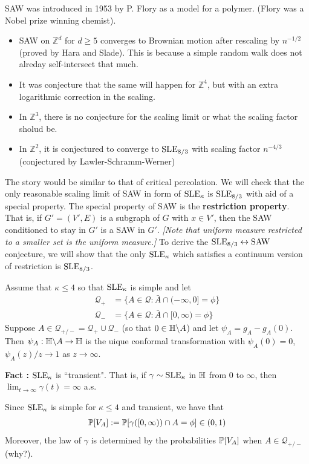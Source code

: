 \documentclass[12pt,a4paper]{article}
\renewenvironment{i}
{\begin{itemize} 
	}%
	{\end{itemize}
}
\begin{document}
\quad SAW was introduced in 1953 by P. Flory as a model for a polymer. (Flory was a Nobel prize winning chemist). 
\begin{i}
\item SAW on $\mathbb{Z}^d$ for $d\geq 5$ converges to Brownian motion after rescaling  by $n^{-1/2}$ (proved by Hara and Slade). This is because a simple random walk does not alreday self-intersect that much.
\item It was conjecture that the same will happen for $\mathbb{Z}^4$, but with an extra logarithmic correction in the scaling.
\item In $\mathbb{Z}^3$, there is no conjecture for the scaling limit or what the scaling factor sholud be.
\item In $\mathbb{Z}^2$, it is conjectured to converge to $\text{SLE}_{8/3}$ with scaling factor $n^{-4/3}$ (conjectured by Lawler-Schramm-Werner)
\end{i}
The story would be similar to that of critical percolation. We will check that the only reasonable scaling limit of SAW in form of $\text{SLE}_{\kappa}$ is $\text{SLE}_{8/3}$ with aid of a special property. The special property of SAW is the \textbf{restriction property}. That is, if $G' = (V', E)$ is a subgraph of $G$ with $x\in V'$, then the SAW conditioned to stay in $G'$ is a SAW in $G'$. \emph{[Note that uniform measure restricted to a smaller set is the uniform measure.]} To derive the $\text{SLE}_{8/3} \leftrightarrow \text{SAW}$ conjecture, we will show that the only $\text{SLE}_{\kappa}$ which satisfies a continuum version of restriction is $\text{SLE}_{8/3}$.

\quad Assume that $\kappa \leq 4$ so that $\text{SLE}_{\kappa}$ is simple and let
\begin{align*}
\mathscr{Q}_+ &= \{A\in \mathscr{Q} : \bar{A} \cap (-\infty, 0] = \phi \} \\
\mathscr{Q}_- &= \{A\in \mathscr{Q} : \bar{A} \cap [0, \infty) = \phi \}
\end{align*}
Suppose $A\in \mathscr{Q}_{+/-} = \mathscr{Q}_+ \cup \mathscr{Q}_-$ (so that $0\in \mathbb{H} \backslash A$) and let $\psi_A = g_A - g_A(0)$. Then $\psi_A : \mathbb{H} \backslash A \rightarrow \mathbb{H}$ is the uique conformal transformation with $\psi_A(0)=0$, $\psi_A(z)/z \rightarrow 1$ as $z\rightarrow \infty$.
\s

\textbf{Fact :} $\text{SLE}_{\kappa}$ is ``transient". That is, if $\gamma \sim \text{SLE}_{\kappa}$ in $\mathbb{H}$ from 0 to $\infty$, then $\lim_{t\rightarrow \infty} \gamma(t) =\infty$ a.s. 
\s

Since $\text{SLE}_{\kappa}$ is simple for $\kappa\leq 4$ and transient, we have that 
\begin{align*}
\mathbb{P}[V_A] := \mathbb{P} [\gamma([0, \infty)) \cap A  = \phi] \in (0,1) 
\end{align*}
Moreover, the law of $\gamma$ is determined by the probabilities $\mathbb{P}[V_A]$ when $A\in \mathscr{Q}_{+/-}$ (why?).
\s
\end{document}
